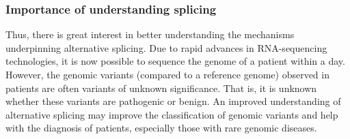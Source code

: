\subsubsection{Importance of understanding splicing}
Thus, there is great interest in better understanding the mechanisms underpinning alternative splicing. Due to rapid advances in RNA-sequencing technologies, it is now possible to sequence the genome of a patient within a day. However, the genomic variants (compared to a reference genome) observed in patients are often variants of unknown significance. \cite{bretschneiderphdthesis} That is, it is unknown whether these variants are pathogenic or benign. An improved understanding of alternative splicing may improve the classification of genomic variants and help with the diagnosis of patients, especially those with rare genomic diseases.

